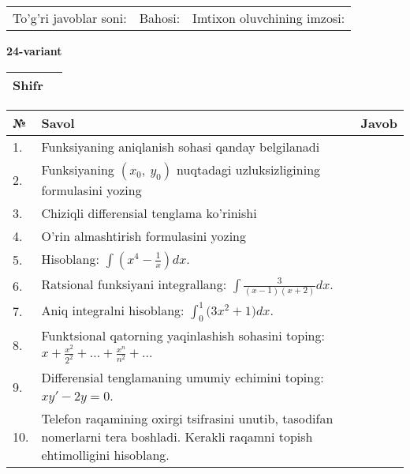 \documentclass{article}
\begin{document}
  \vspace{1cm}
  
  \begin{tabular}{lll}
  To'g'ri javoblar soni: \underline{\hspace{1.5cm}} & 
  Bahosi: \underline{\hspace{1.5cm}} & 
  Imtixon oluvchining imzosi: \underline{\hspace{2cm}} \\
  \end{tabular}
  
  \egroup
  
  \newpage
  
  
  \textbf{24-variant}\\
  
  \bgroup
  \def\arraystretch{1.6} %
  
  \begin{tabular}{|m{5.7cm}|m{9.5cm}|}
  \hline
  Shifr & \\
  \hline
  \end{tabular}
  
  \vspace{1cm}
  
  \begin{tabular}{|m{0.7cm}|m{10cm}|m{4cm}|}
  \hline
  № & Savol & Javob \\
  \hline
  1. & Funksiyaning aniqlanish sohasi qanday belgilanadi &  \\
  \hline
  2. & Funksiyaning \((x_{0},\ y_{0})\) nuqtadagi uzluksizligining formulasini yozing &  \\
  \hline
  3. & Chiziqli differensial tenglama ko'rinishi &  \\
  \hline
  4. & O'rin almashtirish formulasini yozing &  \\
  \hline
  5. & Hisoblang: \(\int \left( x^{4} - \frac{1}{x} \right)dx\). &  \\
  \hline
  6. & Ratsional funksiyani integrallang: \(\int {\frac{3}{(x - 1)(x + 2)}dx}\). &  \\
  \hline
  7. & Aniq integralni hisoblang: \(\int_{0}^{1}{(3x^{2}} + 1)dx\). &  \\
  \hline
  8. & Funktsional qatorning yaqinlashish sohasini toping: \(x + \frac{x^{2}}{2^{2}} + ... + \frac{x^{n}}{n^{2}} + ...\) &  \\
  \hline
  9. & Differensial tenglamaning umumiy echimini toping: \(xy' - 2y = 0\). &  \\
  \hline
  10. & Telefon raqamining oxirgi tsifrasini unutib, tasodifan nomerlarni tera boshladi. Kerakli raqamni topish ehtimolligini hisoblang. &  \\
  \hline
  \end{tabular}
  
\end{document}
